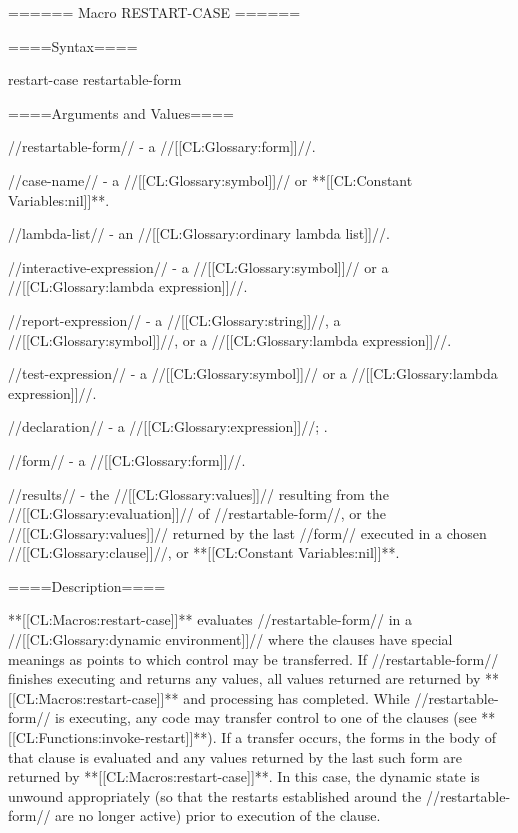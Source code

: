 ====== Macro RESTART-CASE ======

====Syntax====

\DefmacWithValues restart-case {restartable-form {}} {}


====Arguments and Values====

//restartable-form// - a //[[CL:Glossary:form]]//.

//case-name// - a //[[CL:Glossary:symbol]]// or **[[CL:Constant Variables:nil]]**.

//lambda-list// - an //[[CL:Glossary:ordinary lambda list]]//.

//interactive-expression// - a //[[CL:Glossary:symbol]]// or a //[[CL:Glossary:lambda expression]]//.

//report-expression// - a //[[CL:Glossary:string]]//, a //[[CL:Glossary:symbol]]//, or a //[[CL:Glossary:lambda expression]]//.

//test-expression// - a //[[CL:Glossary:symbol]]// or a //[[CL:Glossary:lambda expression]]//.

//declaration// - a  //[[CL:Glossary:expression]]//; \noeval.

//form// - a //[[CL:Glossary:form]]//.

//results// - the //[[CL:Glossary:values]]// resulting from the //[[CL:Glossary:evaluation]]// of //restartable-form//, or the //[[CL:Glossary:values]]// returned by the last //form// executed in a chosen //[[CL:Glossary:clause]]//, or **[[CL:Constant Variables:nil]]**.

====Description====

**[[CL:Macros:restart-case]]** evaluates //restartable-form// in a //[[CL:Glossary:dynamic environment]]// where the clauses have special meanings as points to which control may be transferred. If //restartable-form// finishes executing and returns any values, all values returned are returned by **[[CL:Macros:restart-case]]** and processing has completed. While //restartable-form// is executing, any code may transfer control to one of the clauses (see **[[CL:Functions:invoke-restart]]**). If a transfer occurs, the forms in the body of that clause is evaluated and any values returned by the last such form are returned by **[[CL:Macros:restart-case]]**. In this case, the dynamic state is unwound appropriately (so that the restarts established around the //restartable-form// are no longer active) prior to execution of the clause.


